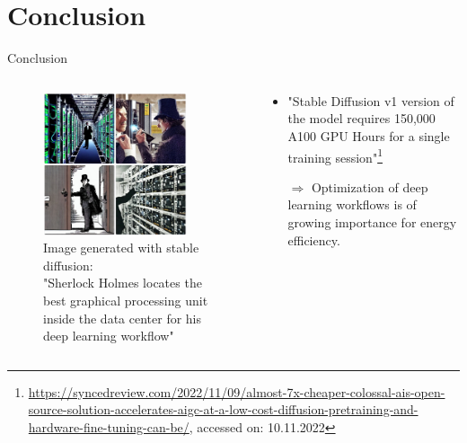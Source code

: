 \documentclass[compress,aspectratio=169]{beamer}
\begin{document}
\section{Conclusion}
\begin{frame}{Conclusion}

\begin{columns}
        \begin{column}{0.5\textwidth}
            \centering
            \vspace{-1em}
            \begin{figure}
            \includegraphics[width=0.85\textwidth]{assets/Sherlock-Holmes-locates-the-best-graphical-processing-unit-inside-the-data-center-for-his-deep-learning-workflow}
            \caption*{Image generated with stable diffusion: \\
            \tiny{"Sherlock Holmes locates the best graphical processing unit inside the data center for his deep learning workflow"}}
            \end{figure}
        \end{column}
        \begin{column}{0.5\textwidth}
            \begin{itemize}
                \item "Stable Diffusion v1 version of the model requires 150,000 A100 GPU Hours for a single training session"\footnote{\tiny{\url{https://syncedreview.com/2022/11/09/almost-7x-cheaper-colossal-ais-open-source-solution-accelerates-aigc-at-a-low-cost-diffusion-pretraining-and-hardware-fine-tuning-can-be/}}, accessed on: 10.11.2022}
                \vspace{1em}
                \item[$\Rightarrow$] Optimization of deep learning workflows is of growing importance for energy efficiency.
            \end{itemize}
        \end{column}
    \end{columns}

\end{frame}
\end{document}
